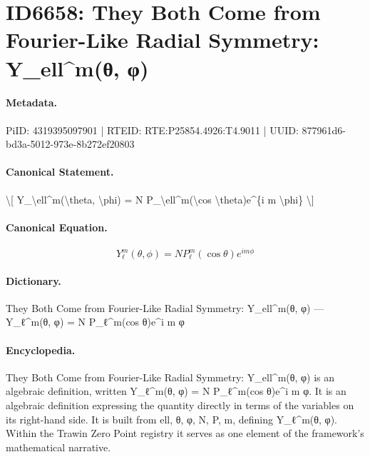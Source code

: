 \section*{ID6658: They Both Come from Fourier-Like Radial Symmetry: Y\_ell\textasciicircum{}m(θ, φ)}
\paragraph{Metadata.}
PiID: 4319395097901 | RTEID: RTE:P25854.4926:T4.9011 | UUID: 877961d6-bd3a-5012-973e-8b272ef20803

\paragraph{Canonical Statement.}
\textbackslash{}[ Y\_\textbackslash{}ell\textasciicircum{}m(\textbackslash{}theta, \textbackslash{}phi) = N P\_\textbackslash{}ell\textasciicircum{}m(\textbackslash{}cos \textbackslash{}theta)e\textasciicircum{}\{i m \textbackslash{}phi\} \textbackslash{}]

\paragraph{Canonical Equation.}
\[
Y_\ell^m(\theta, \phi) = N P_\ell^m(\cos \theta)e^{i m \phi}
\]

\paragraph{Dictionary.}
They Both Come from Fourier-Like Radial Symmetry: Y\_ell\textasciicircum{}m(θ, φ) — Y\_ℓ\textasciicircum{}m(θ, φ) = N P\_ℓ\textasciicircum{}m(cos θ)e\textasciicircum{}i m φ

\paragraph{Encyclopedia.}
They Both Come from Fourier-Like Radial Symmetry: Y\_ell\textasciicircum{}m(θ, φ) is an algebraic definition, written Y\_ℓ\textasciicircum{}m(θ, φ) = N P\_ℓ\textasciicircum{}m(cos θ)e\textasciicircum{}i m φ. It is an algebraic definition expressing the quantity directly in terms of the variables on its right-hand side. It is built from ell, θ, φ, N, P, m, defining Y\_ℓ\textasciicircum{}m(θ, φ). Within the Trawin Zero Point registry it serves as one element of the framework's mathematical narrative.
